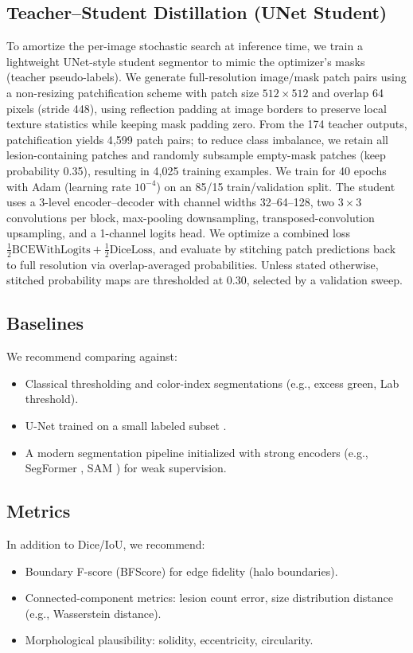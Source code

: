 \documentclass[11pt,a4paper]{article}
\begin{document}
\subsection{Teacher--Student Distillation (UNet Student)}
To amortize the per-image stochastic search at inference time, we train a lightweight UNet-style student segmentor to mimic the optimizer's masks (teacher pseudo-labels).
We generate full-resolution image/mask patch pairs using a non-resizing patchification scheme with patch size $512\times512$ and overlap 64 pixels (stride 448), using reflection padding at image borders to preserve local texture statistics while keeping mask padding zero.
From the 174 teacher outputs, patchification yields 4{,}599 patch pairs; to reduce class imbalance, we retain all lesion-containing patches and randomly subsample empty-mask patches (keep probability 0.35), resulting in 4{,}025 training examples.
We train for 40 epochs with Adam (learning rate $10^{-4}$) on an 85/15 train/validation split.
The student uses a 3-level encoder--decoder with channel widths 32--64--128, two $3\times3$ convolutions per block, max-pooling downsampling, transposed-convolution upsampling, and a 1-channel logits head.
We optimize a combined loss $\tfrac12\mathrm{BCEWithLogits} + \tfrac12\mathrm{DiceLoss}$, and evaluate by stitching patch predictions back to full resolution via overlap-averaged probabilities. Unless stated otherwise, stitched probability maps are thresholded at 0.30, selected by a validation sweep.

\subsection{Baselines}
We recommend comparing against:
\begin{itemize}
    \item Classical thresholding and color-index segmentations (e.g., excess green, Lab threshold).
    \item U-Net trained on a small labeled subset \citep{ronneberger2015u}.
    \item A modern segmentation pipeline initialized with strong encoders (e.g., SegFormer \citep{xie2021segformer}, SAM \citep{kirillov2023segment}) for weak supervision.
\end{itemize}

\subsection{Metrics}
In addition to Dice/IoU, we recommend:
\begin{itemize}
    \item Boundary F-score (BFScore) for edge fidelity (halo boundaries).
    \item Connected-component metrics: lesion count error, size distribution distance (e.g., Wasserstein distance).
    \item Morphological plausibility: solidity, eccentricity, circularity.
\end{itemize}
\end{document}
